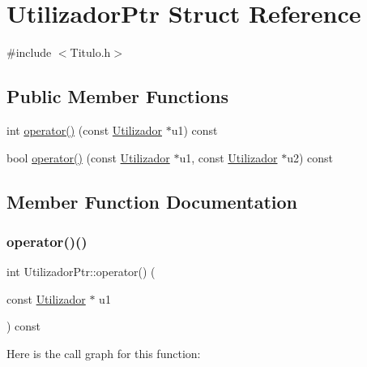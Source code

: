 \hypertarget{struct_utilizador_ptr}{}\section{Utilizador\+Ptr Struct Reference}
\label{struct_utilizador_ptr}


{\ttfamily \#include $<$Titulo.\+h$>$}

\subsection*{Public Member Functions}
\begin{DoxyCompactItemize}
\item 
int \mbox{\hyperlink{struct_utilizador_ptr_a51b14cea42ccf48388754bb5513f736f}{operator()}} (const \mbox{\hyperlink{class_utilizador}{Utilizador}} $\ast$u1) const
\item 
bool \mbox{\hyperlink{struct_utilizador_ptr_afdc486a21619e0451d59dd4a9f244866}{operator()}} (const \mbox{\hyperlink{class_utilizador}{Utilizador}} $\ast$u1, const \mbox{\hyperlink{class_utilizador}{Utilizador}} $\ast$u2) const
\end{DoxyCompactItemize}


\subsection{Member Function Documentation}
\mbox{\label{struct_utilizador_ptr_a51b14cea42ccf48388754bb5513f736f}} 
\subsubsection{\texorpdfstring{operator()()}{operator()()}\hspace{0.1cm}{\footnotesize\ttfamily [1/2]}}
{\footnotesize\ttfamily int Utilizador\+Ptr\+::operator() (\begin{DoxyParamCaption}\item[{const \mbox{\hyperlink{class_utilizador}{Utilizador}} $\ast$}]{u1 }\end{DoxyParamCaption}) const\hspace{0.3cm}{\ttfamily [inline]}}

Here is the call graph for this function\+:
\mbox{\label{struct_utilizador_ptr_afdc486a21619e0451d59dd4a9f244866}} 
